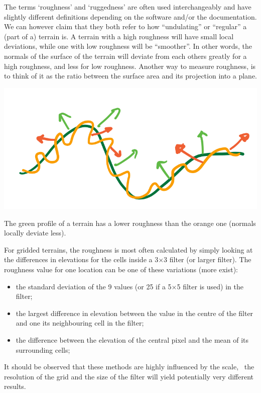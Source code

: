 The terms `roughness' and `ruggedness' are often used interchangeably and have slightly different definitions depending on the software and/or the documentation.
We can however claim that they both refer to how ``undulating'' or ``regular'' a (part of a) terrain is.
A terrain with a high roughness will have small local deviations, while one with low roughness will be ``smoother''.
In other words, the normals of the surface of the terrain will deviate from each others greatly for a high roughness, and less for low roughness.
Another way to measure roughness, is to think of it as the ratio between the surface area and its projection into a plane. 
\begin{marginfigure}
  \centering
  \includegraphics[width=\linewidth]{figs/roughness}
  \caption{The green profile of a terrain has a lower roughness than the orange one (normals locally deviate less).}%
\label{fig:roughness}
\end{marginfigure}

For gridded terrains, the roughness is most often calculated by simply looking at the differences in elevations for the cells inside a 3$\times$3 filter (or larger filter).
The roughness value for one location can be one of these variations (more exist):
\begin{itemize}
  \item the standard deviation of the 9 values (or 25 if a 5$\times$5 filter is used) in the filter;
  \item the largest difference in elevation between the value in the centre of the filter and one its neighbouring cell in the filter;
  \item the difference between the elevation of the central pixel and the mean of its surrounding cells;
\end{itemize}

It should be observed that these methods are highly influenced by the scale, \ie\ the resolution of the grid and the size of the filter will yield potentially very different results.

